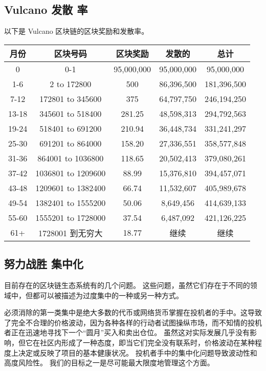 \documentclass[A4paper, 12pt]{article}
\begin{document}
\subsection{Vulcano 发散 率}
以下是 Vulcano 区块链的区块奖励和发散率。
\begin{table}[h]
\centering
\begin{tabular}{@{}ccccc@{}}
\toprule
月份 & 区块号码 & 区块奖励 & 发散的 & 总计 \\ \midrule
0 & 0-1 & 95,000,000 & 95,000,000 & 95,000,000 \\
1-6 & 2 to 172800 & 500 & 86,396,500 & 181,396,500 \\
7-12 & 172801 to 345600 & 375 & 64,797,750 & 246,194,250 \\
13-18 & 345601 to 518400 & 281.25 & 48,598,313 & 294,792,563 \\
19-24 & 518401 to 691200 & 210.94 & 36,448,734 & 331,241,297 \\
25-30 & 691201 to 864000 & 158.20 & 27,336,551 & 358,577,848 \\
31-36 & 864001 to 1036800 & 118.65 & 20,502,413 & 379,080,261 \\
37-42 & 1036801 to 1209600 & 88.99 & 15,376,810 & 394,457,071 \\
43-48 & 1209601 to 1382400 & 66.74 & 11,532,607 & 405,989,678 \\
49-54 & 1382401 to 1555200 & 50.06 & 8,649,456 & 414,639,133 \\
55-60 & 1555201 to 1728000 & 37.54 & 6,487,092 & 421,126,225 \\
61+ & 1728001 到无穷大 & 18.77 & 继续 & 继续 \\ \bottomrule
\end{tabular}
\end{table}

\subsection{	努力战胜 集中化}
目前存在的区块链生态系统有的几个问题。  这些问题，虽然它们存在于不同的领域中，但都可以被描述为过度集中的一种或另一种方式。 

必须消除的第一类集中是绝大多数的代币或网络货币掌握在投机者的手中。这导致了完全不合理的价格波动，因为各种各样的行动者试图操纵市场，而不知情的投机者正在迅速地寻找下一个“圆月”买入和卖出仓位。   虽然这对实际发展几乎没有影响，但它在社区内形成了一种态度，即当它们完全没有联系时，价格波动在某种程度上决定或反映了项目的基本健康状况。  投机者手中的集中化问题导致波动性和高度风险性。             我们的目标之一是尽可能最大限度地管理这个方面。
\end{document}
